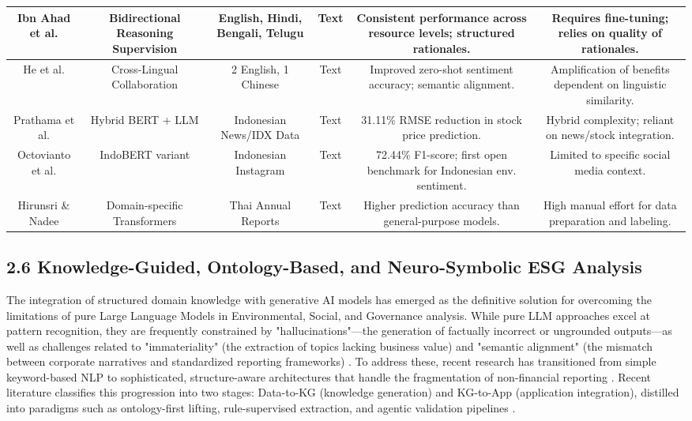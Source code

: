 \documentclass{article}
\begin{document}
\begin{table}[h!]
\begin{tabular}{|c|c|c|c|c|c|}
Ibn Ahad et al.  \parencite{association_for_computational_linguistics_2025_1ba46dee} & Bidirectional Reasoning Supervision & English, Hindi, Bengali, Telugu & Text & Consistent performance across resource levels; structured rationales. & Requires fine-tuning; relies on quality of rationales. \\ \hline
He et al.  \parencite{association_for_computational_linguistics_2025_5a25f994} & Cross-Lingual Collaboration & 2 English, 1 Chinese & Text & Improved zero-shot sentiment accuracy; semantic alignment. & Amplification of benefits dependent on linguistic similarity. \\ \hline
Prathama et al.  \parencite{ubaidillah_ariq_prathama_a1856e2f} & Hybrid BERT + LLM & Indonesian News/IDX Data & Text & 31.11\% RMSE reduction in stock price prediction. & Hybrid complexity; reliant on news/stock integration. \\ \hline
Octovianto et al.  \parencite{christofer_octovianto_487e90aa} & IndoBERT variant & Indonesian Instagram & Text & 72.44\% F1-score; first open benchmark for Indonesian env. sentiment. & Limited to specific social media context. \\ \hline
Hirunsri \& Nadee  \parencite{tharnsaithong_hirunsri_e4c4d75b} & Domain-specific Transformers & Thai Annual Reports & Text & Higher prediction accuracy than general-purpose models. & High manual effort for data preparation and labeling. \\ \hline
\end{tabular}
\end{table}
\subsection{2.6 Knowledge-Guided, Ontology-Based, and Neuro-Symbolic ESG Analysis}

The integration of structured domain knowledge with generative AI models has emerged as the definitive solution for overcoming the limitations of pure Large Language Models in Environmental, Social, and Governance analysis. While pure LLM approaches excel at pattern recognition, they are frequently constrained by "hallucinations"—the generation of factually incorrect or ungrounded outputs—as well as challenges related to "immateriality" (the extraction of topics lacking business value) and "semantic alignment" (the mismatch between corporate narratives and standardized reporting frameworks)  \parencite[]{arash_hajikhani_cbb2528f, keane_ong_8fec4760}. To address these, recent research has transitioned from simple keyword-based NLP to sophisticated, structure-aware architectures that handle the fragmentation of non-financial reporting  \parencite[]{annas_vijaya_dc57c7ec, chaoyue_he_8c389604}. Recent literature classifies this progression into two stages: Data-to-KG (knowledge generation) and KG-to-App (application integration), distilled into paradigms such as ontology-first lifting, rule-supervised extraction, and agentic validation pipelines  \parencite{chaoyue_he_8c389604}.
\end{document}
